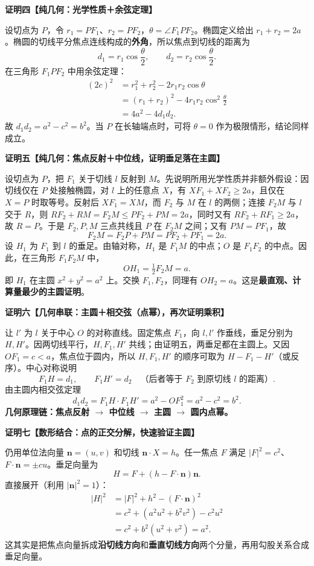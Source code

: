 \begin{proofbox}
\medskip
\textbf{证明四【纯几何：光学性质＋余弦定理】}

设切点为 $P$，令 $r_1=PF_1$、$r_2=PF_2$，$\theta=\angle F_1PF_2$。椭圆定义给出 $r_1+r_2=2a$。椭圆的切线平分焦点连线构成的\textbf{外角}，所以焦点到切线的距离为
\[
d_1=r_1\cos\frac{\theta}{2},\qquad
d_2=r_2\cos\frac{\theta}{2}.
\]
在三角形 $F_1PF_2$ 中用余弦定理：
\[
\begin{aligned}
(2c)^2
&=r_1^2+r_2^2-2r_1r_2\cos\theta\\
&=(r_1+r_2)^2-4r_1r_2\cos^2\frac{\theta}{2}\\
&=4a^2-4d_1d_2.
\end{aligned}
\]
故 $\boxed{d_1d_2=a^2-c^2=b^2}$。当 $P$ 在长轴端点时，可将 $\theta=0$ 作为极限情形，结论同样成立。

\medskip
\textbf{证明五【纯几何：焦点反射＋中位线，证明垂足落在主圆】}

设切点为 $P$，把 $F_1$ 关于切线 $l$ 反射到 $M$。先说明所用光学性质并非额外假设：因切线仅在 $P$ 处接触椭圆，对 $l$ 上的任意点 $X$，有 $XF_1+XF_2\ge2a$，且仅在 $X=P$ 时取等号。反射后 $XF_1=XM$，而 $F_2$ 与 $M$ 在 $l$ 的两侧；连接 $F_2M$ 与 $l$ 交于 $R$，则 $RF_2+RM=F_2M\le PF_2+PM=2a$，同时又有 $RF_2+RF_1\ge2a$，故 $R=P$。于是 $F_2,P,M$ 三点共线且 $P$ 在 $F_2M$ 之间；又有 $PM=PF_1$，故
\[
F_2M=F_2P+PM=PF_2+PF_1=2a.
\]
设 $H_1$ 为 $F_1$ 到 $l$ 的垂足。由轴对称，$H_1$ 是 $F_1M$ 的中点；$O$ 是 $F_1F_2$ 的中点。因此，在三角形 $F_1F_2M$ 中，
\[
\boxed{OH_1=\tfrac12F_2M=a}.
\]
即 $H_1$ 在主圆 $x^2+y^2=a^2$ 上。交换 $F_1,F_2$，同理有 $OH_2=a$。这是\textbf{最直观、计算量最少的主圆证明}。

\medskip
\textbf{证明六【几何串联：主圆＋相交弦（点幂），再次证明乘积】}

让 $l'$ 为 $l$ 关于中心 $O$ 的对称直线。固定焦点 $F_1$，向 $l,l'$ 作垂线，垂足分别为 $H,H'$。因两切线平行，$H,F_1,H'$ 共线；由证明五，两垂足都在主圆上。又因 $OF_1=c<a$，焦点位于圆内，所以 $H,F_1,H'$ 的顺序可取为 $H-F_1-H'$（或反序）。中心对称说明
\[
F_1H=d_1,\qquad F_1H'=d_2
\quad\text{（后者等于 $F_2$ 到原切线 $l$ 的距离）}.
\]
由主圆内相交弦定理
\[
\boxed{d_1d_2=F_1H\cdot F_1H'=a^2-OF_1^2=a^2-c^2=b^2}.
\]
\textbf{几何原理链：焦点反射 $\to$ 中位线 $\to$ 主圆 $\to$ 圆内点幂。}

\medskip
\textbf{证明七【数形结合：点的正交分解，快速验证主圆】}

仍用单位法向量 $\boldsymbol n=(u,v)$ 和切线 $\boldsymbol n\cdot X=h$。任一焦点 $F$ 满足 $|F|^2=c^2$、$F\cdot\boldsymbol n=\pm cu$。垂足向量为
\[
H=F+(h-F\cdot\boldsymbol n)\boldsymbol n.
\]
直接展开（利用 $|\boldsymbol n|^2=1$）：
\[
\begin{aligned}
|H|^2
&=|F|^2+h^2-(F\cdot\boldsymbol n)^2\\
&=c^2+(a^2u^2+b^2v^2)-c^2u^2\\
&=c^2+b^2(u^2+v^2)=\boxed{a^2}.
\end{aligned}
\]
这其实是把焦点向量拆成\textbf{沿切线方向}和\textbf{垂直切线方向}两个分量，再用勾股关系合成垂足向量。


\end{proofbox}
